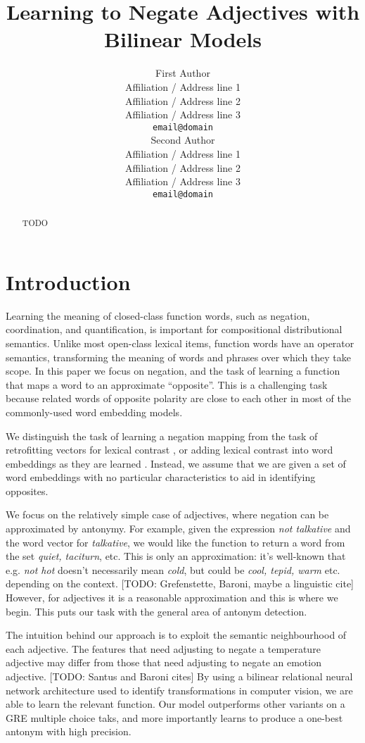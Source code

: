 \documentclass[11pt]{article}
\title{Learning to Negate Adjectives with Bilinear Models}
\author{First Author \\
  Affiliation / Address line 1 \\
  Affiliation / Address line 2 \\
  Affiliation / Address line 3 \\
  {\tt email@domain} \\\And
  Second Author \\
  Affiliation / Address line 1 \\
  Affiliation / Address line 2 \\
  Affiliation / Address line 3 \\
  {\tt email@domain} \\}
\date{}
\begin{document}
\maketitle
\begin{abstract}
 TODO
\vspace{15mm}
\end{abstract}

\section{Introduction}

Learning the meaning of closed-class function words, such as negation,
coordination, and quantification, is important for compositional
distributional semantics. Unlike most open-class lexical items,
function words have an operator semantics, transforming the meaning of
words and phrases over which they take scope. In this paper we focus
on negation, and the task of learning a function that maps a word to
an approximate ``opposite''. This is a challenging task because
related words of opposite polarity are close to each other in most of
the commonly-used word embedding models.

We distinguish the task of learning a negation mapping from the task
of retrofitting vectors for lexical contrast
\cite{nguyen:16,oseaghdha:16}, or adding lexical contrast into word
embeddings as they are learned \cite{pham:15,nguyen:16}. Instead, we
assume that we are given a set of word embeddings with no particular
characteristics to aid in identifying opposites.

We focus on the relatively simple case of adjectives, where negation
can be approximated by antonymy. For example, given the expression
{\it not talkative} and the word vector for {\it talkative}, we would
like the function to return a word from the set {\it quiet, taciturn},
etc. This is only an approximation: it's well-known that e.g. {\it not
  hot} doesn't necessarily mean {\it cold}, but could be {\it cool,
  tepid, warm} etc. depending on the context. [TODO: Grefenstette,
  Baroni, maybe a linguistic cite] However, for adjectives it is a
reasonable approximation and this is where we begin. This puts our
task with the general area of antonym detection.

The intuition behind our approach is to exploit the semantic
neighbourhood of each adjective. The features that need adjusting to
negate a temperature adjective may differ from those that need
adjusting to negate an emotion adjective. [TODO: Santus and Baroni cites] By using a bilinear
relational neural network architecture used to identify
transformations in computer vision, we are able to learn the relevant
function. Our model outperforms other variants on a GRE multiple
choice taks, and more importantly learns to produce a one-best antonym
with high precision.
\end{document}
